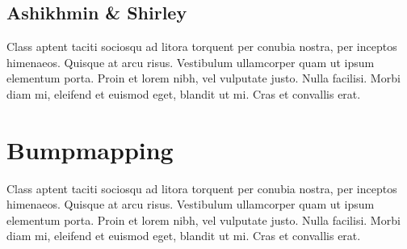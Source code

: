 \subsection{Ashikhmin \& Shirley}
Class aptent taciti sociosqu ad litora torquent per conubia nostra, per inceptos himenaeos. Quisque at arcu risus. Vestibulum ullamcorper quam ut ipsum elementum porta. Proin et lorem nibh, vel vulputate justo. Nulla facilisi. Morbi diam mi, eleifend et euismod eget, blandit ut mi. Cras et convallis erat. 
\section{Bumpmapping}
Class aptent taciti sociosqu ad litora torquent per conubia nostra, per inceptos himenaeos. Quisque at arcu risus. Vestibulum ullamcorper quam ut ipsum elementum porta. Proin et lorem nibh, vel vulputate justo. Nulla facilisi. Morbi diam mi, eleifend et euismod eget, blandit ut mi. Cras et convallis erat. 